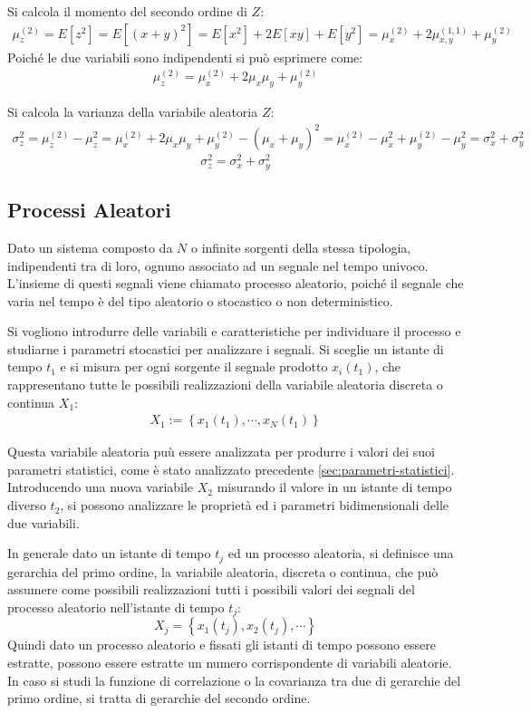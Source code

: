 \documentclass{article}
\numberwithin{equation}{subsection}
\begin{document}
Si calcola il momento del secondo ordine di $Z$:
\begin{gather*}
    \mu_z^{(2)}=E[z^2]=E[(x+y)^2]=E[x^2]+2E[xy]+E[y^2]=\mu_x^{(2)}+2\mu_{x,y}^{(1,1)}+\mu_y^{(2)}
\end{gather*}
Poiché le due variabili sono indipendenti si può esprimere come:
\begin{gather}
    \mu_z^{(2)}=\mu_x^{(2)}+2\mu_x\mu_y+\mu_y^{(2)}
\end{gather}

Si calcola la varianza della variabile aleatoria $Z$:
\begin{gather*}
    \sigma_z^2=\mu_z^{(2)}-\mu_z^2=\mu_x^{(2)}+2\mu_x\mu_y+\mu_y^{(2)}-(\mu_x+\mu_y)^2=\mu_x^{(2)}-\mu_x^2+\mu_y^{(2)}-\mu_y^2=\sigma_x^2+\sigma_y^2
\end{gather*}
\begin{equation}
    \sigma_z^2=\sigma_x^2+\sigma_y^2
\end{equation}

\subsection{Processi Aleatori}

Dato un sistema composto da $N$ o infinite sorgenti della stessa tipologia, indipendenti tra di loro, ognuno associato ad un segnale nel tempo univoco. L'insieme di questi 
segnali viene chiamato processo aleatorio, poiché il segnale che varia nel tempo è del tipo aleatorio o stocastico o non deterministico. 

Si vogliono introdurre delle variabili e caratteristiche per individuare il processo e studiarne i parametri stocastici per analizzare i segnali. 
Si sceglie un istante di tempo $t_1$ e si misura per ogni sorgente il segnale prodotto $x_i(t_1)$, che rappresentano tutte le possibili realizzazioni della variabile 
aleatoria discreta o continua $X_1$:
\begin{gather*}
    X_1:=\left\{x_1(t_1),\cdots,x_N(t_1)\right\}
\end{gather*}

Questa variabile aleatoria puù essere analizzata per produrre i valori dei suoi parametri statistici, come è stato analizzato precedente \ref{sec:parametri-statistici}. 
Introducendo una nuova variabile $X_2$ misurando il valore in un istante di tempo diverso $t_2$, si possono analizzare le proprietà ed i parametri bidimensionali 
delle due variabili. 

In generale dato un istante di tempo $t_j$ ed un processo aleatoria, si definisce una gerarchia del primo ordine, la variabile aleatoria, discreta o continua, che può 
assumere come possibili realizzazioni tutti i possibili valori dei segnali del processo aleatorio nell'istante di tempo $t_j$:
\begin{equation}
    X_j=\left\{x_1(t_j),x_2(t_j),\cdots\right\}
\end{equation}
Quindi dato un processo aleatorio e fissati gli istanti di tempo possono essere estratte, possono essere estratte un numero corrispondente di variabili aleatorie. 
In caso si studi la funzione di correlazione o la covarianza tra due di gerarchie del primo ordine, si tratta di gerarchie del secondo ordine. 
\end{document}
